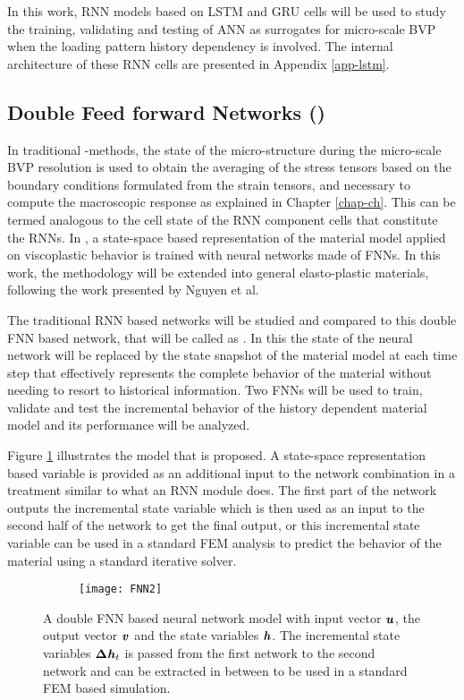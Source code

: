 In this work, RNN models based on LSTM and GRU cells will be used to study the training, validating and testing of ANN as surrogates for micro-scale BVP when the loading pattern history dependency is involved. The internal architecture of these RNN cells are presented in Appendix \ref{app-lstm}.

\subsection{Double Feed forward Networks (\fnn)}\label{nn-fnn2}
In traditional \fee-methods, the state of the micro-structure during the micro-scale BVP resolution is used to obtain the averaging of the stress tensors based on the boundary conditions formulated from the strain tensors, and necessary to compute the macroscopic response as explained in Chapter \ref{chap-ch}. This can be termed analogous to the cell state of the RNN component cells that constitute the RNNs. In \cite{furukawaImplicitConstitutiveModelling1998}, a state-space based representation of the material model applied on viscoplastic behavior is trained with neural networks made of FNNs. In this work, the methodology will be extended into general elasto-plastic materials, following the work presented by Nguyen et al\cite{nguyenSurrogateModelsBasedUnderPreparation}.

The traditional RNN based networks will be studied and compared to this double FNN based network, that will be called as \fnn. In this the state of the neural network will be replaced by the state snapshot of the material model at each time step that effectively represents the complete behavior of the material without needing to resort to historical information. Two FNNs will be used to train, validate and test the incremental behavior of the history dependent material model and its performance will be analyzed.

Figure \ref{fig-nn-fnn2} illustrates the \fnn model that is proposed. A state-space representation based variable is provided as an additional input to the network combination in a treatment similar to what an RNN module does. The first part of the \fnn network outputs the incremental state variable which is then used as an input to the second half of the network to get the final output, or this incremental state variable can be used in a standard FEM analysis to predict the behavior of the material using a standard iterative solver.

\begin{figure}
	\centering
	\begin{subfigure}[t]{0.45\textwidth}
		\texttt{[image: FNN2]}
	\end{subfigure}
	\caption{A double FNN based \fnn neural network model with input vector $ \textbf{\textit{u}} $, the output vector $ \textbf{\textit{v}} $ and the state variables $ \textbf{\textit{h}} $. The incremental state variables $ \bm\Delta\textbf{\textit{h}}_t $ is passed from the first network to the second network and can be extracted in between to be used in a standard FEM based simulation.}\label{fig-nn-fnn2}
\end{figure}

